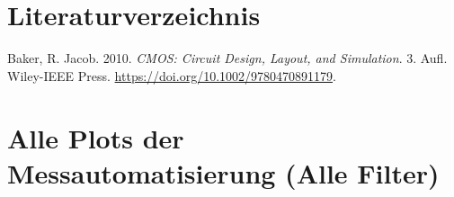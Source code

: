 \documentclass[
  ngerman,
  letterpaper,
  DIV=11]{scrreprt}
\newlength{\cslhangindent}
\newenvironment{CSLReferences}[2] %
 {\begin{list}{}{%
  \setlength{\itemindent}{0pt}
  \setlength{\leftmargin}{0pt}
  \setlength{\parsep}{0pt}
  \ifodd #1
   \setlength{\leftmargin}{\cslhangindent}
   \setlength{\itemindent}{-1\cslhangindent}
  \fi
  \setlength{\itemsep}{#2\baselineskip}}}
 {\end{list}}
\begin{document}
\chapter*{Literaturverzeichnis}\label{literaturverzeichnis}

\label{refs}
\begin{CSLReferences}{1}{0}
Baker, R. Jacob. 2010. \emph{{CMOS}: Circuit Design, Layout, and
Simulation}. 3. Aufl. Wiley-IEEE Press.
\url{https://doi.org/10.1002/9780470891179}.

\end{CSLReferences}

\chapter{Alle Plots der Messautomatisierung (Alle
Filter)}\label{alle-plots-der-messautomatisierung-alle-filter}
\end{document}
